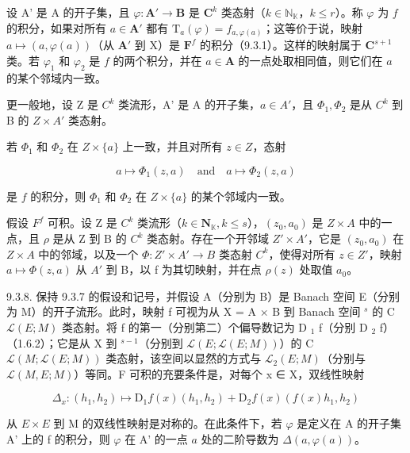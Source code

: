 设 A' 是 A 的开子集，且 \(\varphi: \mathbf{A}' \to \mathbf{B}\) 是 \(\mathbf{C}^k\) 类态射（\(k \in \mathbb{N}_{\mathbb{K}}\)，\(k \leqslant r\)）。称 \(\varphi\) 为 \(f\) 的积分，如果对所有 \(a \in \mathbf{A}'\) 都有 \(\mathrm{T}_a(\varphi) = f_{a,\varphi(a)}\)；这等价于说，映射 \(a \mapsto (a, \varphi(a))\)（从 \(\mathbf{A}'\) 到 X）是 \(\mathbf{F}^f\) 的积分（9.3.1）。这样的映射属于 \(\mathbf{C}^{s+1}\) 类。若 \(\varphi_1\) 和 \(\varphi_2\) 是 \(f\) 的两个积分，并在 \(a \in \mathbf{A}\) 的一点处取相同值，则它们在 \(a\) 的某个邻域内一致。

更一般地，设 Z 是 \(C^{k}\) 类流形，A' 是 A 的开子集，\(a \in A'\)，且 \(\Phi_{1}, \Phi_{2}\) 是从 \(C^{k}\) 到 B 的 \(Z \times A'\) 类态射。

若 \(\Phi_{1}\) 和 \(\Phi_{2}\) 在 \(Z \times \{a\}\) 上一致，并且对所有 \(z \in Z\)，态射

\[
a \mapsto \Phi_ {1} (z, a) \quad \text {and} \quad a \mapsto \Phi_ {2} (z, a)
\]

是 \(f\) 的积分，则 \(\Phi_{1}\) 和 \(\Phi_{2}\) 在 \(Z \times \{a\}\) 的某个邻域内一致。

假设 \(F^{f}\) 可积。设 Z 是 \(C^{k}\) 类流形（\(k \in \mathbf{N}_{\mathbb{K}}, k \leqslant s\)），\((z_{0}, a_{0})\) 是 \(Z \times A\) 中的一点，且 \(\rho\) 是从 Z 到 B 的 \(C^{k}\) 类态射。存在一个开邻域 \(Z' \times A'\)，它是 \((z_{0}, a_{0})\) 在 \(Z \times A\) 中的邻域，以及一个 \(\Phi: Z' \times A' \to B\) 类态射 \(C^{k}\)，使得对所有 \(z \in Z'\)，映射 \(a \mapsto \Phi(z, a)\) 从 \(A'\) 到 B，以 f 为其切映射，并在点 \(\rho(z)\) 处取值 \(a_{0}\)。

9.3.8. 保持 9.3.7 的假设和记号，并假设 A（分别为 B）是 Banach 空间 E（分别为 M）的开子流形。此时，映射 f 可视为从 X = A × B 到 Banach 空间 \(^{s}\) 的 C \(\mathcal{L}(E; M)\) 类态射。将 f 的第一（分别第二）个偏导数记为 D \(_{1}\) f（分别 D \(_{2}\) f）（1.6.2）；它是从 X 到 \(^{s-1}\)（分别到 \(\mathcal{L}(E; \mathcal{L}(E; M))\)）的 C \(\mathcal{L}(M; \mathcal{L}(E; M))\) 类态射，该空间以显然的方式与 \(\mathcal{L}_{2}(E; M)\)（分别与 \(\mathcal{L}(M, E; M)\)）等同。F 可积的充要条件是，对每个 x ∈ X，双线性映射

\[
\Delta_ {x}: (h _ {1}, h _ {2}) \mapsto \mathrm{D} _ {1} f (x) (h _ {1}, h _ {2}) + \mathrm{D} _ {2} f (x) (f (x) h _ {1}, h _ {2})
\]

从 \(E \times E\) 到 M 的双线性映射是对称的。在此条件下，若 \(\varphi\) 是定义在 A 的开子集 A' 上的 f 的积分，则 \(\varphi\) 在 A' 的一点 \(a\) 处的二阶导数为 \(\Delta(a,\varphi(a))\)。

